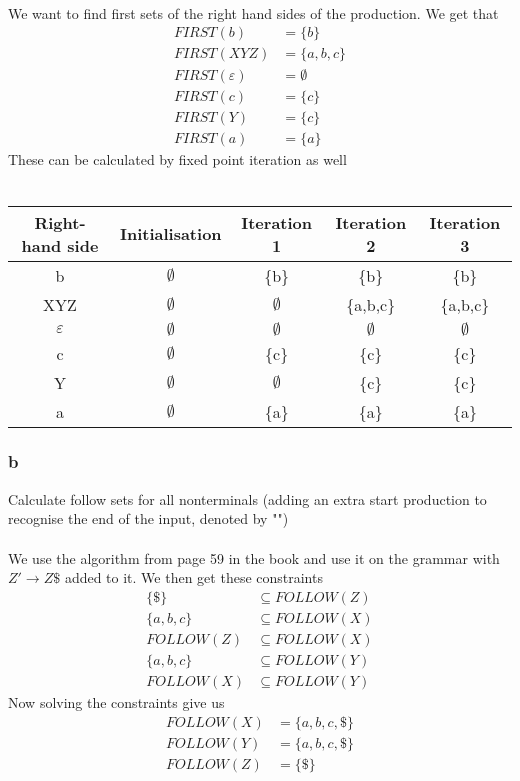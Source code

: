 \documentclass[12pt]{article}
\begin{document}
\\
We want to find first sets of the right hand sides of the production. We get that
\begin{align*}
FIRST(b)&=\{b\} \\
FIRST(XYZ)&=\{a,b,c\} \\
FIRST(\varepsilon)&=\emptyset \\
FIRST(c)&= \{c\} \\
FIRST(Y)&=\{c\} \\
FIRST(a)&=\{a\}
\end{align*}
These can be calculated by fixed point iteration as well\\
\\
\begin{tabular}{c|c|c|c|c}
\hline 
Right-hand side & Initialisation & Iteration 1 & Iteration 2 & Iteration 3 \\ 
\hline 
b & $\emptyset$ & \{b\} & \{b\} & \{b\} \\ 
XYZ & $\emptyset$ & $\emptyset$ & \{a,b,c\} & \{a,b,c\} \\ 
$\varepsilon$ & $\emptyset$ & $\emptyset$ & $\emptyset$ & $\emptyset$ \\ 
c & $\emptyset$ & \{c\} & \{c\} & \{c\} \\  
Y & $\emptyset$ & $\emptyset$ & \{c\} & \{c\} \\ 
a & $\emptyset$ & \{a\} & \{a\} & \{a\} \\ 
\hline
\end{tabular}

\subsubsection*{b}
Calculate follow sets for all nonterminals (adding an extra start production to recognise the end of the input, denoted by "\textdollar") \\
\\
We use the algorithm from page 59 in the book and use it on the grammar with $Z'\rightarrow Z\$ $ added to it. We then get these constraints
\begin{align*}
\{\$\} &\subseteq FOLLOW(Z) \\
\{a,b,c\} &\subseteq FOLLOW(X) \\
FOLLOW(Z) &\subseteq FOLLOW(X) \\
\{a,b,c\} &\subseteq FOLLOW(Y) \\
FOLLOW(X) &\subseteq FOLLOW(Y)
\end{align*}
Now solving the constraints give us
\begin{align*}
FOLLOW(X)&=\{a,b,c,\$\} \\
FOLLOW(Y)&=\{a,b,c,\$\} \\
FOLLOW(Z)&=\{\$\}
\end{align*}
\end{document}
